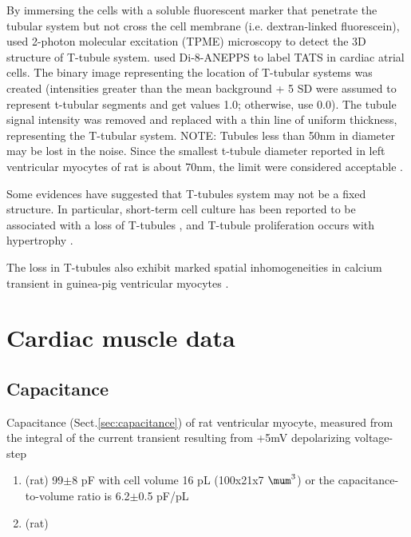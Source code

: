 By immersing the cells with a soluble fluorescent marker that penetrate the
tubular system but not cross the cell membrane (i.e. dextran-linked
fluorescein), \citep{soeller1999} used 2-photon molecular excitation (TPME)
microscopy to detect the 3D structure of T-tubule system. \citep{kirk2003} used
Di-8-ANEPPS to label TATS in cardiac atrial cells. The binary image representing
the location of T-tubular systems was created (intensities greater than the mean
background + 5 SD were assumed to represent t-tubular segments and get values
1.0; otherwise, use 0.0). The tubule signal intensity was removed and replaced
with a thin line of uniform thickness, representing the T-tubular system. NOTE:
Tubules less than 50nm in diameter may be lost in the noise. Since the smallest
t-tubule diameter reported in left ventricular myocytes of rat is about 70nm,
the limit were considered acceptable \citep{soeller1999}.



Some evidences have suggested that T-tubules system may not be a fixed
structure. In particular, short-term cell culture has been reported to be
associated with a loss of T-tubules \citep{lipp1996snu}, and T-tubule
proliferation occurs with hypertrophy \citep{page1973}. 


The loss in T-tubules also exhibit marked spatial inhomogeneities in calcium
transient in guinea-pig ventricular myocytes \citep{lipp1996snu}. 

\section{Cardiac muscle data}
\label{sec:cardiac-muscle-data}

\subsection{Capacitance}
\label{sec:capacitance-cardiac-muscle}


Capacitance (Sect.\ref{sec:capacitance}) of rat ventricular myocyte, measured
from the integral of the current transient resulting from +5mV depolarizing
voltage-step
\begin{enumerate}
  \item (rat) 99$\pm$8 pF with cell volume 16 pL (100x21x7
  $\mum^3$) or the capacitance-to-volume ratio is
  6.2$\pm$0.5 pF/pL \citep{Bouchard1995}
  
  \item (rat) 
\end{enumerate}


